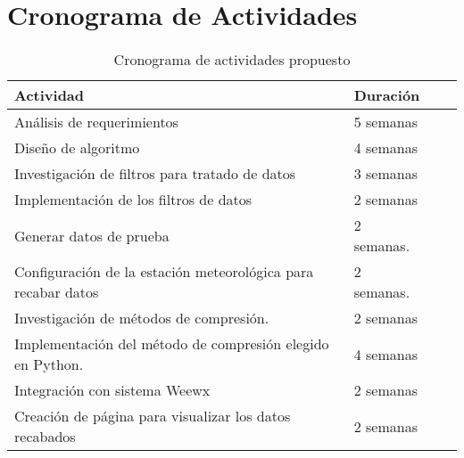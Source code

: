 \section{Cronograma de Actividades}

\begin{table}[!th]
   \begin{tabular}{|p{9cm}|p{2cm}|c|r|}
   \hline
   Actividad & Duración \\ \hline
   Análisis de requerimientos & 5 semanas \\
   Diseño de algoritmo & 4 semanas \\
   Investigación de filtros para tratado de datos & 3 semanas \\
   Implementación de los filtros de datos & 2 semanas\\
   Generar datos de prueba & 2 semanas. \\
   Configuración de la estación meteorológica para recabar datos & 2 semanas. \\
   Investigación de métodos de compresión. & 2 semanas  \\
   Implementación del método de compresión elegido en Python. & 4 semanas \\
   Integración con sistema Weewx & 2 semanas \\
   Creación de página para visualizar los datos recabados  & 2 semanas \\
   \hline
   \end{tabular}
   \caption{Cronograma de actividades propuesto}
   \label{ex:cronograma}
\end{table}
